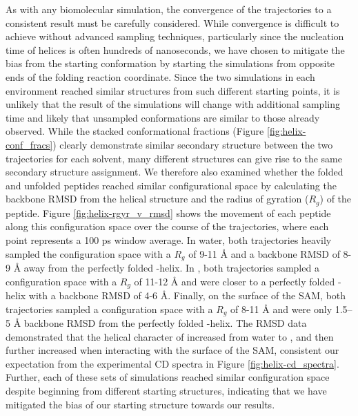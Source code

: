 As with any biomolecular simulation, the convergence of the trajectories to a consistent result must be carefully considered. 
While convergence is difficult to achieve without advanced sampling techniques, particularly since the nucleation time of helices is often hundreds of nanoseconds, we have chosen to mitigate the bias from the starting conformation by starting the simulations from opposite ends of the folding reaction coordinate. 
Since the two simulations in each environment reached similar structures from such different starting points, it is unlikely that the result of the simulations will change with additional sampling time and likely that unsampled conformations are similar to those already observed. 
While the stacked conformational fractions (Figure \ref{fig:helix-conf_fracs}) clearly demonstrate similar secondary structure between the two trajectories for each solvent, many different structures can give rise to the same secondary structure assignment. 
We therefore also examined whether the folded and unfolded peptides reached similar configurational space by calculating the backbone RMSD from the helical structure and the radius of gyration ($R_g$) of the peptide. 
Figure \ref{fig:helix-rgyr_v_rmsd} shows the movement of each peptide along this configuration space over the course of the trajectories, where each point represents a 100 ps window average. 
In water, both trajectories heavily sampled the configuration space with a $R_g$ of 9-11 \si{\angstrom} and a backbone RMSD of 8-9 \si{\angstrom} away from the perfectly folded \textalpha{}-helix. 
In \tbawat{}, both trajectories sampled a configuration space with a $R_g$ of 11-12 \si{\angstrom} and were closer to a perfectly folded \textalpha{}-helix with a backbone RMSD of 4-6 \si{\angstrom}. 
Finally, on the surface of the SAM, both trajectories sampled a configuration space with a $R_g$ of 8-11 \si{\angstrom} and were only 1.5–5 \si{\angstrom} backbone RMSD from the perfectly folded \textalpha{}-helix. 
The RMSD data demonstrated that the helical character of \pep{} increased from water to \tbawat{}, and then further increased when interacting with the surface of the SAM, consistent our expectation from the experimental CD spectra in Figure \ref{fig:helix-cd_spectra}. 
Further, each of these sets of simulations reached similar configuration space despite beginning from different starting structures, indicating that we have mitigated the bias of our starting structure towards our results.

